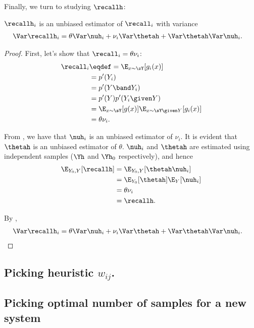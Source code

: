 Finally, we turn to studying $\recallh$:
\begin{theorem}
\label{thm:rhoh}
  $\recallh_i$ is an unbiased estimator of $\recall_i$ with variance
  \begin{align*}
    \Var \recallh_i &= \theta \Var \nuh_i + \nu_i \Var\thetah + \Var\thetah \Var\nuh_i.
  \end{align*}
\end{theorem}
\begin{proof}
  First, let's show that $\recall_i = \theta \nu_i$:
  \begin{align*}
    \recall_i 
    &\eqdef= \E_{x \sim \sY}[g_i(x)] \\
      &= p'(Y_i) \\
      &= p'(Y \band Y_i) \\
      &= p'(Y) p'(Y_i \given Y) \\
      &= \E_{x\sim \sY}[g(x)] \E_{x \sim \sY\given Y}[g_i(x)] \\
      &= \theta \nu_i.
  \end{align*}


  From , we have that $\nuh_i$ is an unbiased estimator of $\nu_i$.
  It is evident that $\thetah$ is an unbiased estimator of $\theta$.
  $\nuh_i$ and $\thetah$ are estimated using independent samples ($\Yh$ and $\Yh_0$ respectively), and hence
  \begin{align*}
    \E_{Y_0, Y}[\recallh] 
      &= \E_{Y_0, Y}[\thetah \nuh_i] \\
      &= \E_{Y_0}[\thetah] \E_Y[\nuh_i] \\
      &= \theta \nu_i \\
      &= \recallh.
  \end{align*}

  By ,
  \begin{align*}
    \Var \recallh_i &= \theta \Var\nuh_i + \nu_i \Var\thetah + \Var\thetah \Var\nuh_i.
  \end{align*}
\end{proof}

\subsection{Picking heuristic $w_{ij}$.}
\label{sec:heuristic-wij}

\subsection{Picking optimal number of samples for a new system}
\label{sec:optimal-samples}

